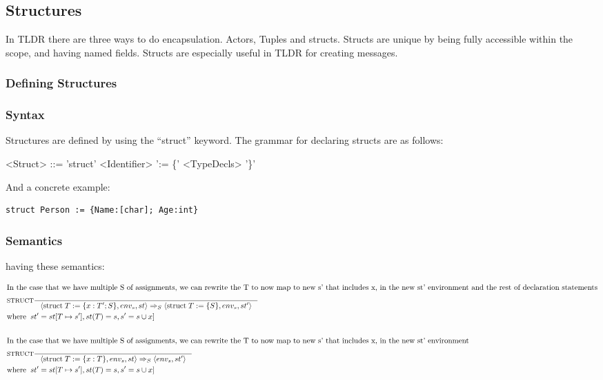 \subsection{Structures}
\label{subsec:structs}

In TLDR there are three ways to do encapsulation. Actors, Tuples and structs. Structs are unique by being fully accessible within the scope, and having named fields. Structs are especially useful in TLDR for creating messages.

\subsubsection{Defining Structures}
\label{sec:defStructures}

\subsubsection{Syntax}

Structures are defined by using the \enquote{struct} keyword. The grammar for declaring structs are as follows:

\begin{grammar}
  <Struct> ::= 'struct' <Identifier> ':= \{' <TypeDecls> '\}'
\end{grammar}

And a concrete example:

\begin{lstlisting}[style=TLDR]
  struct Person := {Name:[char]; Age:int}
\end{lstlisting}

\subsubsection{Semantics}

having these semantics:

\begin{align*}
\intertext{In the case that we have multiple S of assignments, we can rewrite the T to now map to new s' that includes x, in the new st' environment and the rest of declaration statements}
&\inference[$\text{STRUCT}$]{}
                            {\Braket{\Tstruct T := \{x:T';S\}, env_s, st} \Rightarrow_S \Braket{\Tstruct T := \{S\},env_s,st'}}
\\
&{\Twhere st' = st[T \mapsto s'],st(T) = s,s' = s \cup x]}
\\\\
\intertext{In the case that we have multiple S of assignments, we can rewrite the T to now map to new s' that includes x, in the new st' environment}
&\inference[$\text{STRUCT}$]{}
                            {\Braket{\Tstruct T := \{x:T\}, env_s, st} \Rightarrow_S \Braket{env_s,st'}}
\\
&{\Twhere st' = st[T \mapsto s'],st(T) = s,s' = s \cup x]}
\end{align*}

